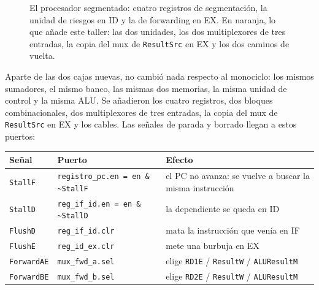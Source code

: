 \documentclass[11pt,letterpaper]{article}
\newcommand{\cod}[1]{\texttt{#1}}
\newcommand{\sig}[1]{\textcolor{control}{\texttt{#1}}}
\begin{document}
\begin{figure}[!htbp]
{}
\caption{El procesador segmentado: cuatro registros de segmentaci\'on, la unidad de riesgos en ID y la
de forwarding en EX. En naranja, lo que a\~nade este taller: las dos unidades, los dos multiplexores de
tres entradas, la copia del mux de \cod{ResultSrc} en EX y los dos caminos de vuelta.}
\label{fig:pipeline}
\end{figure}

Aparte de las dos cajas nuevas, no cambi\'o nada respecto al monociclo: los mismos sumadores, el mismo
banco, las mismas dos memorias, la misma unidad de control y la misma ALU. Se a\~nadieron los cuatro
registros, dos bloques combinacionales, dos multiplexores de tres entradas, la copia del mux de
\cod{ResultSrc} en EX y los cables. Las se\~nales de parada y borrado llegan a estos puertos:

\begin{center}\small
\begin{tabular}{@{}l l l@{}}
\toprule
\textbf{Se\~nal} & \textbf{Puerto} & \textbf{Efecto} \\
\midrule
\sig{StallF} & \cod{registro\_pc.en = en \& \textasciitilde StallF} & el PC no avanza: se vuelve a buscar la misma instrucci\'on \\
\sig{StallD} & \cod{reg\_if\_id.en = en \& \textasciitilde StallD} & la dependiente se queda en ID \\
\sig{FlushD} & \cod{reg\_if\_id.clr} & mata la instrucci\'on que ven\'ia en IF \\
\sig{FlushE} & \cod{reg\_id\_ex.clr} & mete una burbuja en EX \\
\sig{ForwardAE} & \cod{mux\_fwd\_a.sel} & elige \cod{RD1E} / \cod{ResultW} / \cod{ALUResultM} \\
\sig{ForwardBE} & \cod{mux\_fwd\_b.sel} & elige \cod{RD2E} / \cod{ResultW} / \cod{ALUResultM} \\
\bottomrule
\end{tabular}
\end{center}
\end{document}

